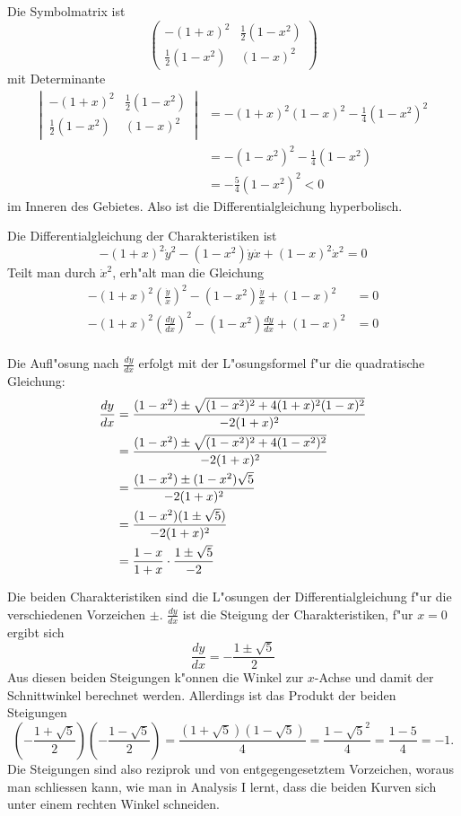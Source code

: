 \begin{loesung}
\begin{teilaufgaben}
\item Die Symbolmatrix ist
\[
\begin{pmatrix}
-(1+x)^2&\frac12(1-x^2)\\
\frac12(1-x^2)&(1-x)^2
\end{pmatrix}
\]
mit Determinante
\begin{align*}
\left|\,\begin{matrix}
-(1+x)^2&\frac12(1-x^2)\\
\frac12(1-x^2)&(1-x)^2
\end{matrix}\,\right|&=
-(1+x)^2(1-x)^2-\frac14(1-x^2)^2
\\
&=-(1-x^2)^2-\frac14(1-x^2)
\\
&=-\frac54(1-x^2)^2<0
\end{align*}
im Inneren des Gebietes. Also ist die Differentialgleichung hyperbolisch.
\item Die Differentialgleichung der Charakteristiken ist
\[
-(1+x)^2\dot y^2-(1-x^2)\dot y\dot x+(1-x)^2\dot x^2=0
\]
Teilt man durch $\dot x^2$, erh"alt man die Gleichung
\begin{align*}
-(1+x)^2\left(\frac{\dot y}{\dot x}\right)^2
-(1-x^2)\frac{\dot y}{\dot x}
+(1-x)^2&=0\\
-(1+x)^2\left(\frac{dy}{dx}\right)^2
-(1-x^2)\frac{dy}{dx}
+(1-x)^2&=0\\
\end{align*}
\item Die Aufl"osung nach $\frac{dy}{dx}$ erfolgt mit der L"osungsformel
f"ur die quadratische Gleichung:
\begin{align*}
\frac{dy}{dx}
&=
\frac{(1-x^2)\pm\sqrt{(1-x^2)^2+4(1+x)^2(1-x)^2}}{-2(1+x)^2}
\\
&=
\frac{(1-x^2)\pm\sqrt{(1-x^2)^2+4(1-x^2)^2}}{-2(1+x)^2}
\\
&=
\frac{(1-x^2)\pm(1-x^2)\sqrt{5}}{-2(1+x)^2}
\\
&=
\frac{(1-x^2)(1\pm\sqrt{5})}{-2(1+x)^2}
\\
&=
\-\frac{1-x}{1+x}\cdot\frac{1\pm\sqrt{5}}{-2}
\end{align*}
\item
Die beiden Charakteristiken sind die L"osungen der Differentialgleichung
f"ur die verschiedenen Vorzeichen $\pm$. $\frac{dy}{dx}$ ist die
Steigung der Charakteristiken, f"ur $x=0$ ergibt sich
\[
\frac{dy}{dx}
=
-\frac{1\pm\sqrt{5}}{2}
\]
Aus diesen beiden Steigungen
k"onnen die Winkel zur $x$-Achse und damit der Schnittwinkel
berechnet werden. Allerdings ist das Produkt der beiden Steigungen
\[
\left(-\frac{1+\sqrt{5}}{2}\right)
\left(-\frac{1-\sqrt{5}}{2}\right)
=\frac{(1+\sqrt{5})(1-\sqrt{5})}{4}=
\frac{1-\sqrt{5}^2}{4}=\frac{1-5}{4}
=-1.
\]
Die Steigungen sind also reziprok und von entgegengesetztem Vorzeichen,
woraus man schliessen kann, wie man in Analysis I lernt, dass die
beiden Kurven sich unter einem rechten Winkel schneiden.
\qedhere
\end{teilaufgaben}
\end{loesung}
